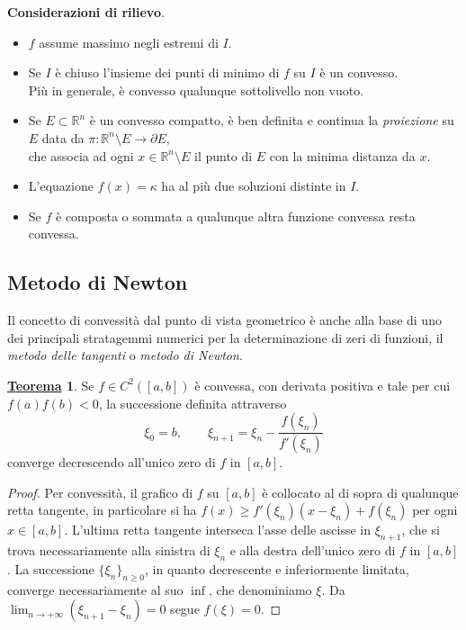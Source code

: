 \documentclass[a4paper,twoside]{article}
\newcommand{\R}{\mathbb{R}}
\theoremstyle{definition}
\newtheorem{theorem}{\color{Red}\underline{\textrm Teorema}}
\numberwithin{theorem}{section}
\begin{document}
\textbf{Considerazioni di rilievo}. 
\begin{itemize}
 \item $f$ assume massimo negli estremi di $I$.
 \item Se $I$ è chiuso l'insieme dei punti di minimo di $f$ su $I$ è un convesso.\\ Più in generale, è convesso qualunque sottolivello non vuoto.
 \item Se $E\subset\R^n$ è un convesso compatto, è ben definita e continua la \emph{proiezione} su $E$ data da $\pi:\R^n\setminus E \to \partial E$,\\ che associa ad ogni $x\in\R^n\setminus E$ il punto di $E$ con la minima distanza da $x$.
 \item L'equazione $f(x)=\kappa$ ha al più due soluzioni distinte in $I$.
 \item Se $f$ è composta o sommata a qualunque altra funzione convessa resta convessa.
\end{itemize}

\subsection{Metodo di Newton}
Il concetto di convessità dal punto di vista geometrico è anche alla base di uno dei principali stratagemmi numerici per la determinazione di zeri di funzioni, il \emph{metodo delle tangenti} o \emph{metodo di Newton}.

\begin{theorem} Se $f\in C^2([a,b])$ è convessa, con derivata positiva e tale per cui $f(a)f(b)<0$, la successione definita attraverso 
$$ \xi_0 = b,\qquad \xi_{n+1} = \xi_n - \frac{f(\xi_n)}{f'(\xi_n)} $$
converge decrescendo all'unico zero di $f$ in $[a,b]$. 
 
\end{theorem}
\begin{proof}
Per convessità, il grafico di $f$ su $[a,b]$ è collocato al di sopra di qualunque retta tangente, in particolare si ha $f(x)\geq f'(\xi_n)(x-\xi_n)+f(\xi_n)$ per ogni $x\in[a,b]$. L'ultima retta tangente interseca l'asse delle ascisse in $\xi_{n+1}$, che si trova necessariamente alla sinistra di $\xi_n$ e alla destra dell'unico zero di $f$ in $[a,b]$. La successione $\{\xi_n\}_{n\geq 0}$, in quanto decrescente e inferiormente limitata, converge necessariamente al suo $\inf$, che denominiamo $\xi$. Da $\lim_{n\to +\infty}(\xi_{n+1}-\xi_n)=0$ segue $f(\xi)=0$.
\end{proof}
\end{document}
